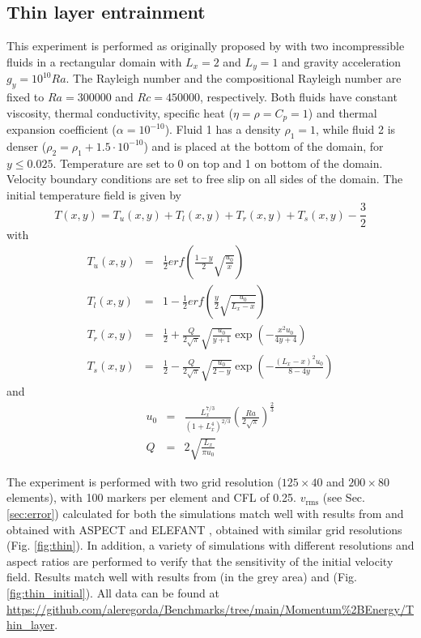 \subsection{Thin layer entrainment}\label{sec:thin}
This experiment is performed as originally proposed by \citet{vanKeken1997} with two incompressible fluids in a rectangular domain with $L_x=2$ and $L_y=1$
and gravity acceleration $g_y=10^{10}Ra$. The Rayleigh number and the compositional Rayleigh number are fixed to $Ra=300000$ and $Rc=450000$, respectively.
Both fluids have constant viscosity, thermal conductivity, specific heat ($\eta=\rho=C_p=1$) and thermal expansion coefficient ($\alpha=10^{-10}$). Fluid 1
has a density $\rho_1=1$, while fluid 2 is denser ($\rho_2=\rho_1+1.5 \cdot 10^{-10}$) and is placed at the bottom of the domain, for $y \leq 0.025$.
Temperature are set to 0 on top and 1 on bottom of the domain. Velocity boundary conditions are set to free slip on all sides of the domain. The initial
temperature field is given by
\[T(x,y)=T_u(x,y)+T_l(x,y)+T_r(x,y)+T_s(x,y)-\frac{3}{2}\]
with
\begin{eqnarray}
T_u(x,y)&=&\frac{1}{2}erf\left(\frac{1-y}{2}\sqrt{\frac{u_0}{x}}\right)\nonumber \\
T_l(x,y)&=&1-\frac{1}{2}erf\left(\frac{y}{2}\sqrt{\frac{u_0}{L_x-x}}\right)\nonumber \\
T_r(x,y)&=&\frac{1}{2}+\frac{Q}{2\sqrt{\pi}}\sqrt{\frac{u_0}{y+1}} \exp\left(-\frac{x^2u_0}{4y+4}\right)\nonumber \\
T_s(x,y)&=&\frac{1}{2}-\frac{Q}{2\sqrt{\pi}}\sqrt{\frac{u_0}{2-y}} \exp\left(-\frac{(L_x-x)^2u_0}{8-4y}\right)\nonumber
\end{eqnarray}
and
\begin{eqnarray}
u_0&=&\frac{L_x^{7/3}}{(1+L_x^4)^{2/3}}\left(\frac{Ra}{2\sqrt{\pi}}\right)^{\frac{2}{3}}\nonumber \\
Q&=&2\sqrt{\frac{L_x}{\pi u_0}}\nonumber
\end{eqnarray}

The experiment is performed with two grid resolution ($125\times40$ and $200\times80$ elements), with 100 markers per element and CFL of 0.25. $v_{\textrm{rms}}$
(see Sec. \ref{sec:error}) calculated for both the simulations match well with results from \citet{vanKeken1997} and obtained with ASPECT
\citep{Kronbichler2012,Heister2017,Bangerth2020,Bangerth2020a} and ELEFANT \citep{Thieulot2014}, obtained with similar grid resolutions
(Fig. \ref{fig:thin}). In addition, a variety of simulations with different resolutions and aspect ratios are performed to verify that the sensitivity of the
initial velocity field. Results match well with results from \citet{vanKeken1997} (in the grey area) and \citet{Thieulot2014} (Fig. \ref{fig:thin_initial}). 
All data can be found at \url{https://github.com/aleregorda/Benchmarks/tree/main/Momentum%2BEnergy/Thin_layer}.

